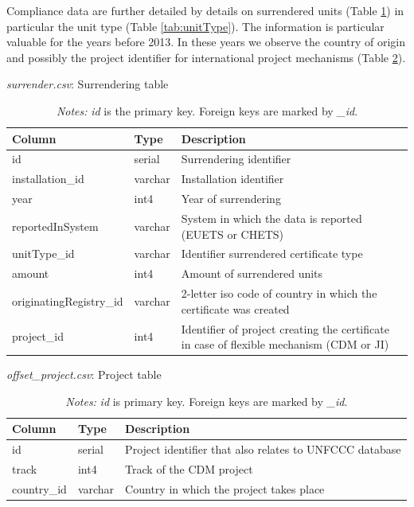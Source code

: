 \documentclass[authoryear]{elsarticle}
\begin{document}
Compliance data are further detailed by details on surrendered units (Table \ref{tab:tbl_surrender}) in particular the unit type (Table \ref{tab:unitType}). The information is particular valuable for the years before 2013. In these years we observe the country of origin and possibly the project identifier for international project mechanisms (Table \ref{tab:tbl_project}). 

\begin{table}[htbp]\scriptsize
	\caption{\textit{surrender.csv}: Surrendering table}\label{tab:tbl_surrender}
	\centering
	\begin{tabular*}{\textwidth}{@{}@{\extracolsep{\fill}} llp{8cm} @{}}
		\toprule
		\toprule
		\textbf{Column} & \textbf{Type}  & \textbf{Description} \\
		\midrule
		id    & serial & Surrendering identifier \\
		installation\_id & varchar & Installation identifier \\
		year  & int4  & Year of surrendering \\
		reportedInSystem & varchar  & System in which the data is reported (EUETS or CHETS) \\
		unitType\_id & varchar & Identifier surrendered certificate type \\
		amount & int4  & Amount of surrendered units \\
		originatingRegistry\_id & varchar & 2-letter iso code of country in which the certificate was created  \\
		project\_id & int4  & Identifier of project creating the certificate in case of flexible mechanism (CDM or JI) \\
		\bottomrule
		\bottomrule
	\end{tabular*}%
	\vspace{-3ex}
\caption*{\footnotesize \emph{Notes:} \textit{id} is the primary key. Foreign keys are marked by \textit{\_id}.}
\vspace{0ex}
\end{table}

\begin{table}[htbp]\scriptsize
	\caption{\textit{offset\_project.csv}: Project table}\label{tab:tbl_project}
	\centering
	\begin{tabular*}{\textwidth}{@{}@{\extracolsep{\fill}} llp{8cm} @{}}
		\toprule
		\toprule
		\textbf{Column} & \textbf{Type}  & \textbf{Description} \\
		\midrule
		id    & serial & Project identifier that also relates to UNFCCC database \\
		track & int4  & Track of the CDM project \\
		country\_id & varchar & Country in which the project takes place \\
		\bottomrule
\bottomrule
\end{tabular*}%
	\vspace{-3ex}
\caption*{\footnotesize \emph{Notes:} \textit{id} is primary key. Foreign keys are marked by \textit{\_id}.}
\vspace{0ex}
\end{table}
\end{document}
